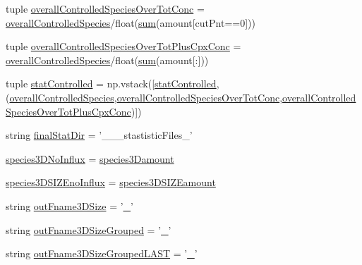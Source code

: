 \begin{DoxyCompactItemize}
\item 
tuple \hyperlink{namespacegeneral_statistics_a1aa6e06b015adb6e6c1462d23ac27fdc}{overall\-Controlled\-Species\-Over\-Tot\-Conc} = \hyperlink{namespacegeneral_statistics_a329d09d383e53e22ade6723b35e103d8}{overall\-Controlled\-Species}/float(\hyperlink{crea__influx_8m_a59a869fb2b28d56dacd91c09e1dffc8d}{sum}(amount\mbox{[}cut\-Pnt==0\mbox{]}))
\item 
tuple \hyperlink{namespacegeneral_statistics_ae4d5f219fa4de0de3ad4968fd52b4e61}{overall\-Controlled\-Species\-Over\-Tot\-Plus\-Cpx\-Conc} = \hyperlink{namespacegeneral_statistics_a329d09d383e53e22ade6723b35e103d8}{overall\-Controlled\-Species}/float(\hyperlink{crea__influx_8m_a59a869fb2b28d56dacd91c09e1dffc8d}{sum}(amount\mbox{[}\-:\mbox{]}))
\item 
tuple \hyperlink{namespacegeneral_statistics_ac380b2dd5c569341f6295d2e8e7337f0}{stat\-Controlled} = np.\-vstack(\mbox{[}\hyperlink{namespacegeneral_statistics_ac380b2dd5c569341f6295d2e8e7337f0}{stat\-Controlled},(\hyperlink{namespacegeneral_statistics_a329d09d383e53e22ade6723b35e103d8}{overall\-Controlled\-Species},\hyperlink{namespacegeneral_statistics_a1aa6e06b015adb6e6c1462d23ac27fdc}{overall\-Controlled\-Species\-Over\-Tot\-Conc},\hyperlink{namespacegeneral_statistics_ae4d5f219fa4de0de3ad4968fd52b4e61}{overall\-Controlled\-Species\-Over\-Tot\-Plus\-Cpx\-Conc})\mbox{]})
\item 
string \hyperlink{namespacegeneral_statistics_a4f197037332b3c3891277d8becc9fb92}{final\-Stat\-Dir} = '\-\_\-\-\_\-\_\-stastistic\-Files\-\_\-'
\item 
\hyperlink{namespacegeneral_statistics_ab0b7c4a5bea76a8e43a176a8438cdb81}{species3\-D\-No\-Influx} = \hyperlink{namespacegeneral_statistics_a717d9bbd4459fc3d0c6d358cdbdc3287}{species3\-Damount}
\item 
\hyperlink{namespacegeneral_statistics_a16af43c0053996886f2c1f6f0d99fae2}{species3\-D\-S\-I\-Z\-Eno\-Influx} = \hyperlink{namespacegeneral_statistics_a49505b471d187739723d5212c07a7a0a}{species3\-D\-S\-I\-Z\-Eamount}
\item 
string \hyperlink{namespacegeneral_statistics_af956e5e24f6fb8519c5142bd589caeca}{out\-Fname3\-D\-Size} = '\hyperlink{start_8m_a280c5f85d1264d1df5d06bc5ea8b550c}{\-\_\-}'
\item 
string \hyperlink{namespacegeneral_statistics_a0f53a86c9390e90115eaa38967ac1eab}{out\-Fname3\-D\-Size\-Grouped} = '\hyperlink{start_8m_a280c5f85d1264d1df5d06bc5ea8b550c}{\-\_\-}'
\item 
string \hyperlink{namespacegeneral_statistics_a41b8a01562c7b02335cd9693c3e23742}{out\-Fname3\-D\-Size\-Grouped\-L\-A\-S\-T} = '\hyperlink{start_8m_a280c5f85d1264d1df5d06bc5ea8b550c}{\-\_\-}'

\end{DoxyCompactItemize}

